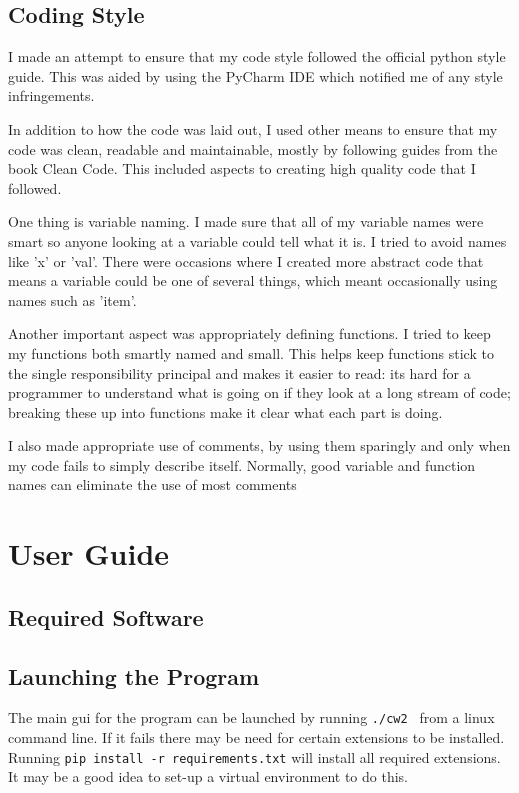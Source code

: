 \documentclass[11pt]{report}
\begin{document}
\section{Coding Style}
I made an attempt to ensure that my code style followed the official python style guide\cite{_pep_????}.  This was aided by using the PyCharm IDE\cite{_pycharm_????} which notified me of any style infringements.

In addition to how the code was laid out, I used other means to ensure that my code was clean, readable and maintainable, mostly by following guides from the book Clean Code\cite{martin_clean_2008}.  This included aspects to creating high quality code that I followed.

One thing is variable naming.  I made sure that all of my variable names were smart so anyone looking at a variable could tell what it is.  I tried to avoid names like 'x' or 'val'.  There were occasions where I created more abstract code that means a variable could be one of several things, which meant occasionally using names such as 'item'.

Another important aspect was appropriately defining functions.  I tried to keep my functions both smartly named and small.  This helps keep functions stick to the single responsibility principal and makes it easier to read:  its hard for a programmer to understand what is going on if they look at a long stream of code; breaking these up into functions make it clear what each part is doing.

I also made appropriate use of comments, by using them sparingly and only when my code fails to simply describe itself.  Normally, good variable and function names can eliminate the use of most comments


\chapter{User Guide}
\section{Required Software}

\section{Launching the Program}
The main gui for the program can be launched by running \lstinline{./cw2 } from a linux command line.  If it fails there may be need for certain extensions to be installed.  Running \lstinline{pip install -r requirements.txt} will install all required extensions.  It may be a good idea to set-up a virtual environment\cite{_virtual_????} to do this.
\end{document}
